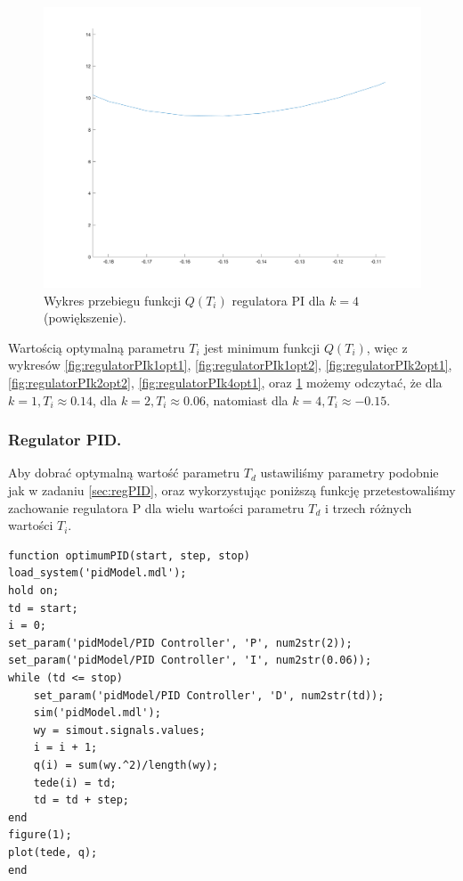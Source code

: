 \documentclass[a4paper,10pt]{article}
\begin{document}
\begin{figure}[!h]
    \centering
	\includegraphics[width=130mm]{PI-opt-k4-zoom.png}
	\caption{Wykres przebiegu funkcji $Q(T_{i})$ regulatora PI dla $k=4$ (powiększenie).}
    \label{fig:regulatorPIk4opt2}
\end{figure}
\newpage Wartością optymalną parametru $T_{i}$ jest minimum funkcji $Q(T_{i})$, więc z wykresów \ref{fig:regulatorPIk1opt1}, \ref{fig:regulatorPIk1opt2}, \ref{fig:regulatorPIk2opt1}, \ref{fig:regulatorPIk2opt2}, \ref{fig:regulatorPIk4opt1}, oraz \ref{fig:regulatorPIk4opt2} możemy odczytać, że dla $k=1, T_{i} \approx 0.14$, dla $k=2, T_{i} \approx 0.06$, natomiast dla $k=4, T_{i} \approx -0.15$.

\subsubsection{Regulator PID.}\label{sec:optPID}
Aby dobrać optymalną wartość parametru $T_{d}$ ustawiliśmy parametry podobnie jak w zadaniu \ref{sec:regPID}, oraz wykorzystując poniższą funkcję przetestowaliśmy zachowanie regulatora P dla wielu wartości parametru $T_{d}$ i trzech różnych wartości $T_{i}$. \\
\begin{lstlisting}[caption=Funkcja testująca regulator PID.]
function optimumPID(start, step, stop)
load_system('pidModel.mdl');
hold on;
td = start;
i = 0;
set_param('pidModel/PID Controller', 'P', num2str(2));
set_param('pidModel/PID Controller', 'I', num2str(0.06));
while (td <= stop)
	set_param('pidModel/PID Controller', 'D', num2str(td));
	sim('pidModel.mdl');
	wy = simout.signals.values;
	i = i + 1;
	q(i) = sum(wy.^2)/length(wy);
	tede(i) = td;
	td = td + step;
end
figure(1);
plot(tede, q);
end
\end{lstlisting}
\end{document}
